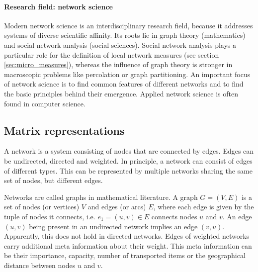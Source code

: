 \documentclass[openright,twoside,headsepline]{scrbook}
\begin{document}
\paragraph{Research field: network science\color{Cayenne}{.}}
Modern network science is an interdisciplinary research field, because it addresses systems of diverse scientific affinity.
Its roots lie in graph theory (mathematics) and social network analysis (social sciences).
Social network analysis plays a particular role for the definition of local network measures (see section \ref{sec:micro_measures}), whereas the influence of graph theory is stronger in macroscopic problems like percolation or graph partitioning.
An important focus of network science is to find common features of different networks and to find the basic principles behind their emergence.
Applied network science is often found in computer science.

\subsection{Matrix representations}\label{sec:network_matrices}
A network is a system consisting of nodes that are connected by edges.
Edges can be undirected, directed and weighted.
In principle, a network can consist of edges of different types.
This can be represented by multiple networks sharing the same set of nodes, but different edges.

Networks are called graphs in mathematical literature.
A graph $G=(V,E)$ is a set of nodes (or vertices) $V$ and edges (or arcs) $E$, where each edge is given by the tuple of nodes it connects, i.e. $e_1 =(u,v) \in E$ connects nodes $u$ and $v$.
An edge $(u,v)$ being present in an undirected network implies an edge $(v,u)$.
Apparently, this does not hold in directed networks.
Edges of weighted networks carry additional meta information about their weight.
This meta information can be their importance, capacity, number of transported items or the geographical distance between nodes $u$ and $v$.
\end{document}
